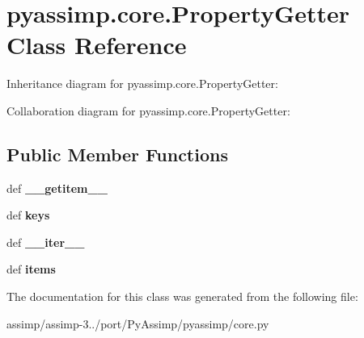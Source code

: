 \hypertarget{classpyassimp_1_1core_1_1_property_getter}{\section{pyassimp.\+core.\+Property\+Getter Class Reference}
\label{classpyassimp_1_1core_1_1_property_getter}
}


Inheritance diagram for pyassimp.\+core.\+Property\+Getter\+:


Collaboration diagram for pyassimp.\+core.\+Property\+Getter\+:
\subsection*{Public Member Functions}
\begin{DoxyCompactItemize}
\item 
\hypertarget{classpyassimp_1_1core_1_1_property_getter_ade89f5fd30bd0a040062d0d41cbb8db7}{def {\bfseries \+\_\+\+\_\+getitem\+\_\+\+\_\+}}\label{classpyassimp_1_1core_1_1_property_getter_ade89f5fd30bd0a040062d0d41cbb8db7}

\item 
\hypertarget{classpyassimp_1_1core_1_1_property_getter_ac9af40cf592fa332fc9311ab6d224bd7}{def {\bfseries keys}}\label{classpyassimp_1_1core_1_1_property_getter_ac9af40cf592fa332fc9311ab6d224bd7}

\item 
\hypertarget{classpyassimp_1_1core_1_1_property_getter_a3782175512b4e362f1a5e318b5983c76}{def {\bfseries \+\_\+\+\_\+iter\+\_\+\+\_\+}}\label{classpyassimp_1_1core_1_1_property_getter_a3782175512b4e362f1a5e318b5983c76}

\item 
\hypertarget{classpyassimp_1_1core_1_1_property_getter_aadbfc6f954cb50c960b1a94eacf504f8}{def {\bfseries items}}\label{classpyassimp_1_1core_1_1_property_getter_aadbfc6f954cb50c960b1a94eacf504f8}

\end{DoxyCompactItemize}


The documentation for this class was generated from the following file\+:\begin{DoxyCompactItemize}
\item 
assimp/assimp-\/3../port/\+Py\+Assimp/pyassimp/core.\+py\end{DoxyCompactItemize}

